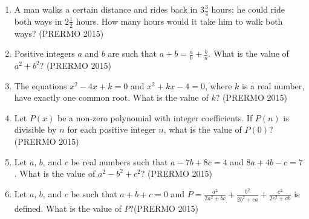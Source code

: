 
\begin{enumerate}
    \item A man walks a certain distance and rides back in $ 3\frac{3}{4} $ hours; he could ride both ways in $ 2\frac{1}{2} $ hours. How many hours would it take him to walk both ways? \hfill(PRERMO 2015)

    \item Positive integers $a$ and $b$ are such that $ a + b = \frac{a}{b} + \frac{b}{a} $. What is the value of $ a^2 + b^2 $? \hfill(PRERMO 2015)

    \item The equations $ x^2 - 4x + k = 0 $ and $ x^2 + kx - 4 = 0 $, where $k$ is a real number, have exactly one common root. What is the value of $ k $? \hfill(PRERMO 2015)

    \item Let $P(x)$ be a non-zero polynomial with integer coefficients. If $ P(n) $ is divisible by $n$ for each positive integer $n$, what is the value of $P(0)$? \hfill(PRERMO 2015)

    \item Let $a$, $b$, and $c$ be real numbers such that $ a - 7b + 8c = 4 $ and $ 8a + 4b - c = 7 $. What is the value of $ a^2 - b^2 + c^2 $? \hfill(PRERMO 2015)

    \item Let $a$, $b$, and $c$ be such that $a + b + c = 0$ and 
    $
    P = \frac{a^2}{2a^2 + bc} + \frac{b^2}{2b^2 + ca} + \frac{c^2}{2c^2 + ab}
    $
    is defined. What is the value of $P$?\hfill(PRERMO 2015)
    \end{enumerate}
